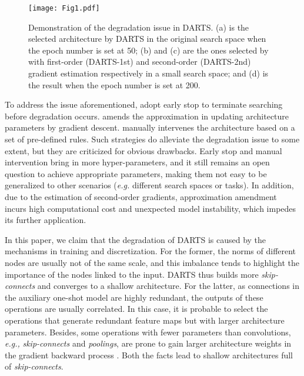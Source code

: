 \documentclass[journal]{IEEEtran}
\begin{document}
\begin{figure*}[!htb]

\begin{center}
\end{center}
	\texttt{[image: Fig1.pdf]}
   \caption{Demonstration of the degradation issue in DARTS. (a) is the selected architecture by DARTS in the original search space when the epoch number is set at 50; (b) and (c) are the ones selected by with first-order (DARTS-1st) and second-order (DARTS-2nd) gradient estimation respectively in a small search space; and (d) is the result when the epoch number is set at 200.}
\label{fig:fig0}
\end{figure*} 



To address the issue aforementioned, \cite{DBLP:journals/corr/abs-1909-06035,DBLP:journals/corr/abs-1909-09656} adopt early stop to terminate searching before degradation occurs. \cite{DBLP:journals/corr/abs-1910-11831} amends the approximation in updating architecture parameters by gradient descent. \cite{DBLP:journals/corr/abs-1904-12760} manually intervenes the architecture based on a set of pre-defined rules. Such strategies do alleviate the degradation issue to some extent, but they are criticized for obvious drawbacks. Early stop and manual intervention bring in more hyper-parameters, and it still remains an open question to achieve appropriate parameters, making them not easy to be generalized to other scenarios (\emph{e.g.} different search spaces or tasks). In addition, due to the estimation of second-order gradients, approximation amendment incurs high computational cost and unexpected model instability, which impedes its further application.

In this paper, we claim that the degradation of DARTS is caused by the mechanisms in training and discretization. For the former, the norms of different nodes are usually not of the same scale, and this imbalance tends to highlight the importance of the nodes linked to the input.  DARTS thus builds more \textit{skip-connects} and converges to a shallow architecture. For the latter, as connections in the auxiliary one-shot model are highly redundant, the outputs of these operations are usually  correlated. In this case, it is probable to select the operations that generate redundant feature maps but with larger architecture parameters. Besides, some operations with fewer parameters than convolutions, \emph{e.g.,} \textit{skip-connects} and \textit{poolings}, are prone to gain larger architecture weights in the gradient backward process \cite{DBLP:journals/corr/abs-1904-12760}. Both the facts lead to shallow architectures full of \textit{skip-connects}.
\end{document}
